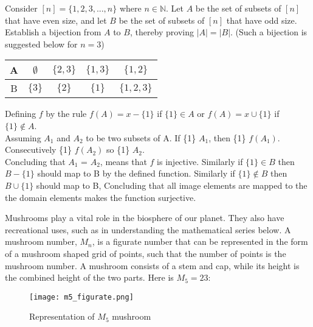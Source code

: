 \documentclass[addpoints]{exam}
\begin{document}
\begin{questions}
\begin{solution}
  \end{solution}

\question[15] Consider $[n] = \{1,2,3,...,n\}$ where $n \in \mathbb{N}$. Let $A$ be the set of subsets of $[n]$ that have even size, and let $B$ be the set of subsets of $[n]$ that have odd size. Establish a bijection from $A$ to $B$, thereby proving $|A| = |B|$. (Such a bijection is suggested below for $n = 3$) 

\begin{center}

  \begin{tabular}{ |c || c | c | c |c |}
    \hline
 A & $\emptyset$ & $\{2,3\}$ & $\{1,3\}$ & $\{1,2\}$ \\ \hline
 B & $\{3\}$ & $\{2\}$ & $\{1\}$ & $\{1,2,3\}$\\\hline
\end{tabular}
\end{center}

  \begin{solution}
    
Defining $f$ by the rule $f(A) = x - \{1\} $ if $\{1\} \in A$ or $f(A) = x  \cup \{1\}$ if $\{1\} \notin A$.\\
Assuming $A_1$ and $A_2$ to be two subsets of A. If \{1\} \in $A_1$, then \{1\} \notin $f(A_1)$.\\
Consecutively \{1\} \notin  $f(A_2)$ so \{1\} \in $A_2$.\\
Concluding that $A_1$ = $A_2$, means that $f$ is injective. Similarly if $\{1\} \in B$ then $B - \{1\}$ should map to B by the defined function. Similarly if $\{1\} \notin B$ then $B \cup \{1\}$ should map to B, Concluding that all image elements are mapped to the the domain elements makes the function surjective.
  \end{solution}
  
\question Mushrooms play a vital role in the biosphere of our planet. They also have recreational uses, such as in understanding the mathematical series below. A mushroom number, $M_n$, is a figurate number that can be represented in the form of a mushroom shaped grid of points, such that the number of points is the mushroom number. A mushroom consists of a stem and cap, while its height is the combined height of the two parts. Here is $M_5=23$:

\begin{figure}[h]
  \centering
  \texttt{[image: m5\_figurate.png]}
  \caption{Representation of $M_5$ mushroom}
  \label{fig:mushroom_anatomy}
\end{figure}


\end{questions}
\end{document}
